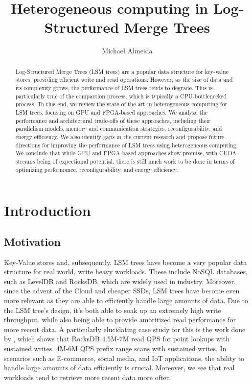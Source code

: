 \documentclass[sigconf]{acmart}
\title{Heterogeneous computing in Log-Structured Merge Trees}
\author{Michael Almeida}
\affiliation{
  \institution{Harvard University}
  \city{Cambridge} \state{Massachusets} \country{USA}
}
\begin{document}
\begin{abstract}
Log-Structured Merge Trees (LSM trees) are a popular data structure for
key-value stores, providing efficient write and read operations.
However, as the size of data and its complexity grows, the performance of LSM trees tends to degrade. 
This is particularly true of the compaction process, which is typically a CPU-bottlenecked process. 
To this end, we review the state-of-the-art in heterogeneous computing for LSM trees, focusing on GPU and FPGA-based approaches.
We analyze the performance and architectural trade-offs of these approaches, including their parallelism models, memory and communication strategies, reconfigurability, and energy efficiency.
We also identify gaps in the current research and propose future directions for improving the performance of LSM trees using heterogeneous computing.
We conclude that while GPU and FPGA-based approaches show promise, with CUDA streams being of expectional potential, there is still much work to be done in terms of optimizing performance, reconfigurability, and energy efficiency.
\end{abstract}

\maketitle

\section{Introduction}
  \subsection{Motivation}
   Key-Value stores and, subsequently, LSM trees have become a very popular data structure for real world, write heavy workloads. These include NoSQL databases, such as LevelDB and RocksDB, which are widely used in industry.
    Moreover, since the advent of the Cloud and cheaper SSDs, LSM trees have become even more relevant as they are able to efficiently handle large amounts of data.
    Due to the LSM tree's design, it's both able to soak up an extremely high write throughput, while also being able to provide amoritized read performance for more recent data. 
    A particularly elucidating case study for this is the work done by \cite{rocksdb}, which shows that RocksDB 4.5M-7M read QPS for point lookups with sustained writes. 4M-6M QPS prefix range scans with sustained writes.
    In scenarios such as E-commerce, social media, and IoT applications, the ability to handle large amounts of data efficiently is crucial. Moreover, we see that real workloads tend to retrieve more recent data more often.
\end{document}

